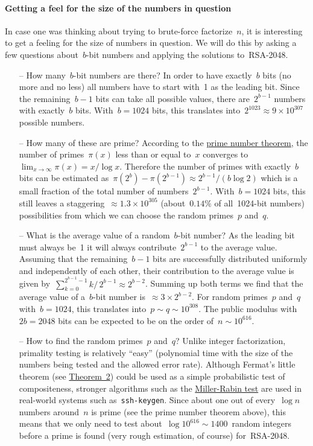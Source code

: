 \documentclass{article}
\begin{document}
\paragraph{Getting a feel for the size of the numbers in question}  In case one was thinking about trying to brute-force factorize~$n$, it is interesting to get a feeling for the size of numbers in question.  We will do this by asking a few questions about~$b$-bit numbers and applying the solutions to~RSA-2048.
\begin{itemize}
\item[--] How many~$b$-bit numbers are there?  In order to have exactly~$b$ bits (no more and no less) all numbers have to start with~1 as the leading bit.  Since the remaining~$b-1$ bits can take all possible values, there are~$2^{b-1}$ numbers with exactly~$b$ bits.  With~$b=1024$ bits, this translates into~$2^{1023} \approx 9 \times 10^{307}$ possible numbers.
\item[--] How many of these are prime?  According to the \href{https://en.wikipedia.org/wiki/Prime_number_theorem}{prime number theorem}, the number of primes~$\pi(x)$ less than or equal to~$x$ converges to~$\lim_{x \rightarrow \infty} \pi(x) = x / \log x$.  Therefore the number of primes with exactly~$b$ bits can be estimated as~$\pi ( 2^b )  - \pi ( 2^{b-1} ) \approx 2^{b-1} / (b \log 2)$ which is a small fraction of the total number of numbers~$2^{b-1}$.  With~$b=1024$ bits, this still leaves a staggering~$\approx 1.3 \times 10^{305}$ (about~$0.14\%$ of all~1024-bit numbers) possibilities from which we can choose the random primes~$p$ and~$q$.
\item [--] What is the average value of a random~$b$-bit number?  As the leading bit must always be~1 it will always contribute~$2^{b-1}$ to the average value.  Assuming that the remaining~$b-1$ bits are successfully distributed uniformly and independently of each other, their contribution to the average value is given by~$\sum_{k=0}^{2^{b-1}-1} k / \, 2^{b-1} \approx 2^{b-2}$.  Summing up both terms we find that the average value of a~$b$-bit number is~$\approx 3 \times 2^{b-2}$.  For random primes~$p$ and~$q$ with~$b = 1024$, this translates into~$p \sim q \sim 10^{308}$.  The public modulus with~$2b = 2048$ bits can be expected to be on the order of~$n \sim 10^{616}$.
\item [--] How to find the random primes~$p$ and~$q$?  Unlike integer factorization, primality testing is relatively ``easy'' (polynomial time with the size of the numbers being tested and the allowed error rate).  Although Fermat's little theorem (see \hyperlink{theorem2}{Theorem~2}) could be used as a simple probabilistic test of compositeness, stronger algorithms such as the \href{https://en.wikipedia.org/wiki/Miller\%E2\%80\%93Rabin_primality_test}{Miller-Rabin test} are used in real-world systems such as~\texttt{ssh-keygen}. Since about one out of every~$\log n$ numbers around~$n$ is prime (see the prime number theorem above), this means that we only need to test about~$\log 10^{616} \sim 1400$~random integers before a prime is found (very rough estimation, of course) for~RSA-2048.
\end{itemize}
\end{document}
